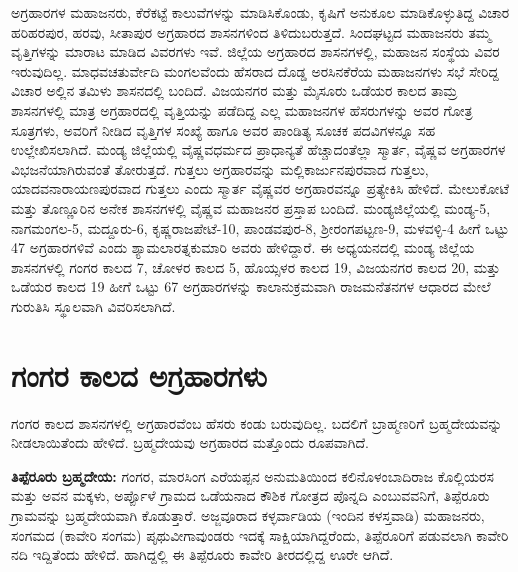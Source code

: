 ಅಗ್ರಹಾರಗಳ ಮಹಾಜನರು, ಕೆರೆಕಟ್ಟೆ ಕಾಲುವೆಗಳನ್ನು ಮಾಡಿಸಿ\-ಕೊಂಡು, ಕೃಷಿಗೆ ಅನುಕೂಲ ಮಾಡಿಕೊಳ್ಳುತಿದ್ದ ವಿಚಾರ ಹರಿಹರಪುರ, ಹರವು, ಸೀತಾಪುರ ಅಗ್ರಹಾರದ ಶಾಸನಗಳಿಂದ ತಿಳಿದುಬರುತ್ತದೆ. ಸಿಂದಘಟ್ಟದ ಮಹಾಜನರು ತಮ್ಮ ವೃತ್ತಿಗಳನ್ನು ಮಾರಾಟ ಮಾಡಿದ ವಿವರಗಳು ಇವೆ. ಜಿಲ್ಲೆಯ ಅಗ್ರಹಾರದ ಶಾಸನಗಳಲ್ಲಿ, ಮಹಾಜನ ಸಂಸ್ಥೆಯ ವಿವರ ಇರುವುದಿಲ್ಲ. ಮಾಧವಚತುರ್ವೇದಿ ಮಂಗಲವೆಂದು ಹೆಸರಾದ ದೊಡ್ಡ ಅರಸಿನಕೆರೆಯ ಮಹಾಜನಗಳು ಸಭೆ ಸೇರಿದ್ದ ವಿಚಾರ ಅಲ್ಲಿನ ತಮಿಳು ಶಾಸನದಲ್ಲಿ ಬಂದಿದೆ. ವಿಜಯನಗರ ಮತ್ತು ಮೈಸೂರು ಒಡೆಯರ ಕಾಲದ ತಾಮ್ರ ಶಾಸನಗಳಲ್ಲಿ ಮಾತ್ರ ಅಗ್ರಹಾರದಲ್ಲಿ ವೃತ್ತಿಯನ್ನು ಪಡೆದಿದ್ದ ಎಲ್ಲ ಮಹಾಜನಗಳ ಹೆಸರುಗಳನ್ನು ಅವರ ಗೋತ್ರ ಸೂತ್ರಗಳು, ಅವರಿಗೆ ನೀಡಿದ ವೃತ್ತಿಗಳ ಸಂಖ್ಯೆ ಹಾಗೂ ಅವರ ಪಾಂಡಿತ್ಯ ಸೂಚಕ ಪದವಿಗಳನ್ನೂ ಸಹ ಉಲ್ಲೇಖಿಸಲಾಗಿದೆ. ಮಂಡ್ಯ ಜಿಲ್ಲೆಯಲ್ಲಿ ವೈಷ್ಣವಧರ್ಮದ ಪ್ರಾಧಾನ್ಯತೆ ಹೆಚ್ಚಾದಂತೆಲ್ಲಾ ಸ್ಮಾರ್ತ, ವೈಷ್ಣವ ಅಗ್ರಹಾರಗಳ ವಿಭಜನೆಯಾಗಿರುವಂತೆ ತೋರುತ್ತದೆ. ಗುತ್ತಲು ಅಗ್ರಹಾರವನ್ನು ಮಲ್ಲಿಕಾರ್ಜುನಪುರವಾದ ಗುತ್ತಲು, ಯಾದವನಾರಾಯಣಪುರವಾದ ಗುತ್ತಲು ಎಂದು ಸ್ಮಾರ್ತ ವೈಷ್ಣವರ ಅಗ್ರಹಾರವನ್ನೂ ಪ್ರತ್ಯೇಕಿಸಿ ಹೇಳಿದೆ. ಮೇಲುಕೋಟೆ ಮತ್ತು ತೊಣ್ಣೂರಿನ ಅನೇಕ ಶಾಸನಗಳಲ್ಲಿ ವೈಷ್ಣವ ಮಹಾಜನರ ಪ್ರಸ್ತಾಪ ಬಂದಿದೆ. ಮಂಡ್ಯಜಿಲ್ಲೆಯಲ್ಲಿ ಮಂಡ್ಯ-5, ನಾಗಮಂಗಲ-5, ಮದ್ದೂರು-6, ಕೃಷ್ಣರಾಜಪೇಟೆ-10, ಪಾಂಡವಪುರ-8, ಶ‍್ರೀರಂಗಪಟ್ಟಣ-9, ಮಳವಳ್ಳಿ-4 ಹೀಗೆ ಒಟ್ಟು 47 ಅಗ್ರಹಾರಗಳಿವೆ ಎಂದು ಶ್ಯಾಮಲಾರತ್ನಕುಮಾರಿ ಅವರು ಹೇಳಿದ್ದಾರೆ. ಈ ಅಧ್ಯಯನದಲ್ಲಿ ಮಂಡ್ಯ ಜಿಲ್ಲೆಯ ಶಾಸನಗಳಲ್ಲಿ ಗಂಗರ ಕಾಲದ 7, ಚೋಳರ ಕಾಲದ 5, ಹೊಯ್ಸಳರ ಕಾಲದ 19, ವಿಜಯನಗರ ಕಾಲದ 20, ಮತ್ತು ಒಡೆಯರ ಕಾಲದ 19 ಹೀಗೆ ಒಟ್ಟು 67 ಅಗ್ರಹಾರಗಳನ್ನು ಕಾಲಾನುಕ್ರಮವಾಗಿ ರಾಜಮನೆತನಗಳ ಆಧಾರದ ಮೇಲೆ ಗುರುತಿಸಿ ಸ್ಥೂಲವಾಗಿ ವಿವರಿಸಲಾಗಿದೆ.

\section*{ಗಂಗರ ಕಾಲದ ಅಗ್ರಹಾರಗಳು}

\vskip 2pt

ಗಂಗರ ಕಾಲದ ಶಾಸನಗಳಲ್ಲಿ ಅಗ್ರಹಾರವೆಂಬ ಹೆಸರು ಕಂಡು ಬರುವುದಿಲ್ಲ. ಬದಲಿಗೆ ಬ್ರಾಹ್ಮಣರಿಗೆ ಬ್ರಹ್ಮದೇಯವನ್ನು ನೀಡಲಾಯಿತೆಂದು ಹೇಳಿದೆ. ಬ್ರಹ್ಮದೇಯವು ಅಗ್ರಹಾರದ ಮತ್ತೊಂದು ರೂಪವಾಗಿದೆ.

\vskip 2pt

\textbf{ತಿಪ್ಪೆರೂರು ಬ್ರಹ್ಮದೇಯ:} ಗಂಗರ, ಮಾರಸಿಂಗ ಎರೆಯಪ್ಪನ ಅನುಮತಿಯಿಂದ ಕಲಿನೊಳಂಬಾದಿರಾಜ ಕೊಲ್ಲಿಯರಸ ಮತ್ತು ಅವನ ಮಕ್ಕಳು, ಅರ್ಪ್ಪೊಳೆ ಗ್ರಾಮದ ಒಡೆಯನಾದ ಕೌಶಿಕ ಗೋತ್ರದ ಪೊನ್ನದಿ ಎಂಬುವವನಿಗೆ, ತಿಪ್ಪೆರೂರು ಗ್ರಾಮವನ್ನು ಬ್ರಹ್ಮದೇಯವಾಗಿ ಕೊಡುತ್ತಾರೆ. ಅಜ್ಜವೂರಾದ ಕಳ್ಳರ್ವಾಡಿಯ (ಇಂದಿನ ಕಳಸ್ತವಾಡಿ) ಮಹಾಜನರು, ಸಂಗಮದ (ಕಾವೇರಿ ಸಂಗಮ) ಪೃಥುವೀಗಾವುಂಡರು ಇದಕ್ಕೆ ಸಾಕ್ಷಿಯಾಗಿದ್ದರೆಂದು, ತಿಪ್ಪೆರೂರಿಗೆ ಪಡುವಲಾಗಿ ಕಾವೇರಿ ನದಿ ಇದ್ದಿತೆಂದು ಹೇಳಿದೆ. ಹಾಗಿದ್ದಲ್ಲಿ ಈ ತಿಪ್ಪೆರೂರು ಕಾವೇರಿ ತೀರದಲ್ಲಿದ್ದ ಊರೇ ಆಗಿದೆ.

